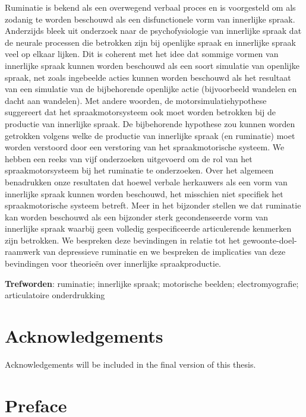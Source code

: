 \documentclass[a4paper,12pt,twoside,onecolumn,openright,final,oldfontcommands]{memoir}
\newcommand{\initial}[1]{
	\lettrine[lines=3,lhang=0.33,nindent=0em]{
		\color{gray}
     		{\textsc{#1}}}{}}
\newcommand\blankpage{%
    \null
    \thispagestyle{empty}%
    \newpage
    }
\begin{document}
\initial{R}uminatie is bekend als een overwegend verbaal proces en is voorgesteld om als zodanig te worden beschouwd als een disfunctionele vorm van innerlijke spraak. Anderzijds bleek uit onderzoek naar de psychofysiologie van innerlijke spraak dat de neurale processen die betrokken zijn bij openlijke spraak en innerlijke spraak veel op elkaar lijken. Dit is coherent met het idee dat sommige vormen van innerlijke spraak kunnen worden beschouwd als een soort simulatie van openlijke spraak, net zoals ingebeelde acties kunnen worden beschouwd als het resultaat van een simulatie van de bijbehorende openlijke actie (bijvoorbeeld wandelen en dacht aan wandelen). Met andere woorden, de motorsimulatiehypothese suggereert dat het spraakmotorsysteem ook moet worden betrokken bij de productie van innerlijke spraak. De bijbehorende hypothese zou kunnen worden getrokken volgens welke de productie van innerlijke spraak (en ruminatie) moet worden verstoord door een verstoring van het spraakmotorische systeem. We hebben een reeks van vijf onderzoeken uitgevoerd om de rol van het spraakmotorsysteem bij het ruminatie te onderzoeken. Over het algemeen benadrukken onze resultaten dat hoewel verbale herkauwers als een vorm van innerlijke spraak kunnen worden beschouwd, het misschien niet specifiek het spraakmotorische systeem betreft. Meer in het bijzonder stellen we dat ruminatie kan worden beschouwd als een bijzonder sterk gecondenseerde vorm van innerlijke spraak waarbij geen volledig gespecificeerde articulerende kenmerken zijn betrokken. We bespreken deze bevindingen in relatie tot het gewoonte-doel-raamwerk van depressieve ruminatie en we bespreken de implicaties van deze bevindingen voor theorieën over innerlijke spraakproductie.

\vspace{\baselineskip}

\textbf{Trefworden}: ruminatie; innerlijke spraak; motorische beelden; electromyografie; articulatoire onderdrukking

\afterpage{\blankpage}

\chapter*{Acknowledgements}

\initial{A}cknowledgements will be included in the final version of this thesis.

\afterpage{\blankpage}

\chapter*{Preface}
\end{document}
